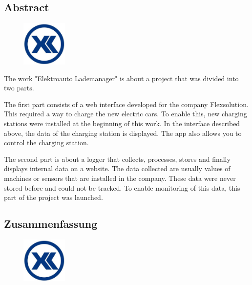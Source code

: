 \begin{spacing}{1}
    \chapter*{Abstract}
\end{spacing}
\begin{figure}
    \begin{center}
      \includegraphics[width=0.2\textwidth]{pics/Firmenlogo.jpeg}
    \end{center}
\end{figure}
The work "Elektroauto Lademanager" is about a project that was divided into two parts.

The first part consists of a web interface developed for the company Flexsolution. This required a way to charge the new electric cars. To enable this, new charging stations were installed at the beginning of this work. In the interface described above, the data of the charging station is displayed. The app also allows you to control the charging station.

The second part is about a logger that collects, processes, stores and finally displays internal data on a website. The data collected are usually values of machines or sensors that are installed in the company. These data were never stored before and could not be tracked. To enable monitoring of this data, this part of the project was launched.
\newpage
\begin{spacing}{1}
    \chapter*{Zusammenfassung}
\end{spacing}
\begin{figure}
    \begin{center}
      \includegraphics[width=0.2\textwidth]{pics/Firmenlogo.jpeg}
    \end{center}
\end{figure}

